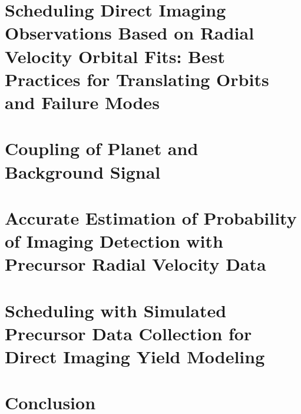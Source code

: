 \documentclass[phd,tocprelim]{cornell}
\begin{document}
\chapter{Scheduling Direct Imaging Observations Based on Radial Velocity Orbital Fits: Best Practices for Translating Orbits and Failure Modes}
\label{cha:first_paper}


\chapter{Coupling of Planet and Background Signal}
\label{cha:coupling}


\chapter{Accurate Estimation of Probability of Imaging Detection with Precursor Radial Velocity Data}
\label{cha:accurate_pdet}


\chapter{Scheduling with Simulated Precursor Data Collection for Direct Imaging Yield Modeling}
\label{cha:sim_and_scheduling}


\chapter{Conclusion}
\label{cha:conclusion}



\appendix


\end{document}
